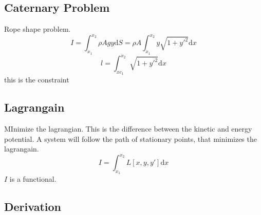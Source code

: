\documentclass[a4paper, 11pt,twoside]{memoir}
\begin{document}
        \subsection{Caternary Problem}
        Rope shape problem.
        \[ 
        I = \int_{x_1}^{x_2} \rho A g y \mathrm{d} S = \rho A \int_{x_1}^{x_2} y \sqrt{1 + y'^2}  \mathrm{d}  x   
        \]
        \[ 
        l = \int_{xc_1}^{x_2} \sqrt{1 + y'^2}  \mathrm{d}  x 
        \] this is the constraint 
        \subsection{Lagrangain}
        MInimize the lagrangian. This is the difference between the kinetic and energy potential. A system will follow the path of stationary points, that minimizes the lagrangain. 
        \[ 
            I = \int_{x_1}^{x_2} L [x,y,y'] \mathrm{d}  x 
        \] $I$ is a functional.

        \subsection{Derivation}
\end{document}
